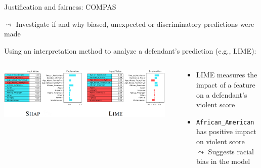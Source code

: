 \documentclass[11pt,compress,t,notes=noshow, aspectratio=169, xcolor=table]{beamer}
\begin{document}
\begin{frame}{Justification and fairness: COMPAS }

    $\leadsto$ Investigate if and why biased, unexpected or discriminatory predictions were made 

\medskip

    Using an interpretation method to analyze a defendant's prediction (e.g., LIME):
    

    \medskip
    \centering
       \begin{columns}[T, totalwidth=\textwidth]
        \begin{column}{0.5\textwidth}
            
    \includegraphics[trim=695 50 5 0, width=0.95\textwidth, clip]{figure/COMPAS_shap_lime_example.png}
        \end{column}
        \begin{column}{0.5\textwidth}
        \begin{itemize}
            \item LIME measures the impact of a feature on a defendant's violent score
            \item \texttt{African\_American} has positive impact on violent score\\
            $\leadsto$ Suggests racial bias in the model
        \end{itemize}
        
        \end{column}
    \end{columns}
\end{frame}






\end{document}
